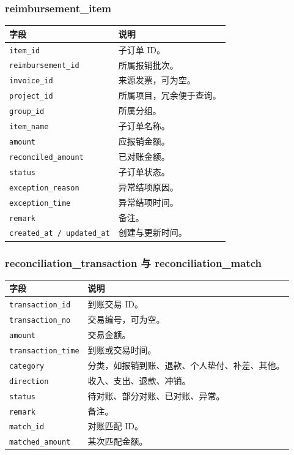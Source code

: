 \documentclass[UTF8,zihao=-4]{ctexart}
\begin{document}
\subsubsection{reimbursement\_item}

\begin{longtable}{p{4.2cm}p{10.2cm}}
\toprule
字段 & 说明 \\
\midrule
\texttt{item\_id} & 子订单 ID。 \\
\texttt{reimbursement\_id} & 所属报销批次。 \\
\texttt{invoice\_id} & 来源发票，可为空。 \\
\texttt{project\_id} & 所属项目，冗余便于查询。 \\
\texttt{group\_id} & 所属分组。 \\
\texttt{item\_name} & 子订单名称。 \\
\texttt{amount} & 应报销金额。 \\
\texttt{reconciled\_amount} & 已对账金额。 \\
\texttt{status} & 子订单状态。 \\
\texttt{exception\_reason} & 异常结项原因。 \\
\texttt{exception\_time} & 异常结项时间。 \\
\texttt{remark} & 备注。 \\
\texttt{created\_at / updated\_at} & 创建与更新时间。 \\
\bottomrule
\end{longtable}

\subsubsection{reconciliation\_transaction 与 reconciliation\_match}

\begin{longtable}{p{4.2cm}p{10.2cm}}
\toprule
字段 & 说明 \\
\midrule
\texttt{transaction\_id} & 到账交易 ID。 \\
\texttt{transaction\_no} & 交易编号，可为空。 \\
\texttt{amount} & 交易金额。 \\
\texttt{transaction\_time} & 到账或交易时间。 \\
\texttt{category} & 分类，如报销到账、退款、个人垫付、补差、其他。 \\
\texttt{direction} & 收入、支出、退款、冲销。 \\
\texttt{status} & 待对账、部分对账、已对账、异常。 \\
\texttt{remark} & 备注。 \\
\texttt{match\_id} & 对账匹配 ID。 \\
\texttt{matched\_amount} & 某次匹配金额。 \\
\bottomrule
\end{longtable}
\end{document}
